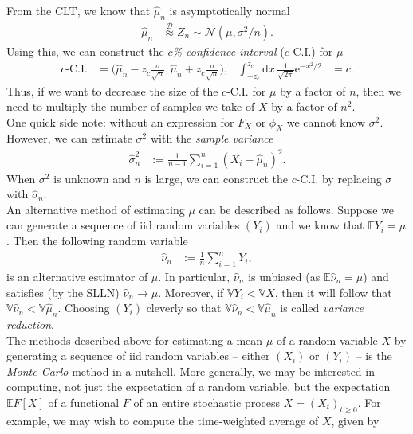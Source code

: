 \documentclass[12pt]{book}
\numberwithin{equation}{chapter}
\theoremstyle{plain}
\numberwithin{theorem}{section}
\theoremstyle{definition}
\numberwithin{exercise}{chapter}
\newcommand{\<}{\langle}
\renewcommand{\>}{\rangle}
\renewcommand{\(}{\left(}
\renewcommand{\)}{\right)}
\renewcommand{\[}{\left[}
\renewcommand{\]}{\right]}
\newcommand\Eb{\mathds{E}}
\newcommand\Vb{\mathds{V}}
\newcommand\Dc{\mathscr{D}}
\newcommand\Nc{\mathscr{N}}
\newcommand\sig{\sigma}
\newcommand\nuh{\widehat{\nu}}
\newcommand\muh{\widehat{\mu}}
\newcommand\sigh{\widehat{\sig}}
\newcommand\dd{\mathrm{d}}
\newcommand\ee{\mathrm{e}}
\begin{document}
From the CLT, we know that $\muh_n$ is asymptotically normal
\begin{align}
\muh_n
	&\stackrel{\Dc}{\approx} Z_n \sim \Nc( \mu, \sig^2/n) .
\end{align}
Using this, we can construct the \emph{$c$\% confidence interval} ($c$-C.I.) for $\mu$
\begin{align}
\text{$c$-C.I.}
	&=	\Big( \muh_n - z_c \frac{\sig}{\sqrt{n}},\muh_n + z_c \frac{\sig}{\sqrt{n}}\Big) , &
\int_{-z_c}^{z_c} \dd x \, \frac{1}{\sqrt{2\pi}}\ee^{-x^2/2} 
	&=	c .
\end{align}
Thus, if we want to decrease the size of the $c$-C.I. for $\mu$ by a factor of $n$, then we need to multiply the number of samples we take of $X$ by a factor of $n^2$.
\\[0.5em]
One quick side note: without an expression for $F_X$ or $\phi_X$ we cannot know $\sig^2$.  However, we can estimate $\sig^2$ with the \emph{sample variance} 
\begin{align}
\sigh_n^2
	&:=	\frac{1}{n-1} \sum_{i=1}^n (X_i - \muh_n )^2 .
\end{align}
When $\sig^2$ is unknown and $n$ is large, we can construct the $c$-C.I. by replacing $\sig$ with $\sigh_n$.
\\[0.5em]
An alternative method of estimating $\mu$ can be described as follows.  Suppose we can generate a sequence of iid random variables $(Y_i)$ and we know that $\Eb Y_i = \mu$.  Then the following random variable
\begin{align}
\nuh_n
	&:=	\frac{1}{n} \sum_{i=1}^n Y_i ,
\end{align}
is an alternative estimator of $\mu$.  In particular, $\nuh_n$ is unbiased (as $\Eb \nuh_n = \mu$) and satisfies (by the SLLN) $\nuh_n \to \mu$.  Moreover, if $\Vb Y_i < \Vb X$, then it will follow that $\Vb \nuh_n < \Vb \muh_n$.  Choosing $(Y_i)$ cleverly so that $\Vb \nuh_n < \Vb \muh_n$ is called \emph{variance reduction}.
\\[0.5em]
The methods described above for estimating a mean $\mu$ of a random variable $X$ by generating a sequence of iid random variables -- either $(X_i)$ or $(Y_i)$ -- is the \emph{Monte Carlo} method in a nutshell.  More generally, we may be interested in computing, not just the expectation of a random variable, but the expectation $\Eb F[X]$ of a functional $F$ of an entire stochastic process $X = (X_t)_{t \geq 0}$.  For example, we may wish to compute the time-weighted average of $X$, given by
\end{document}
